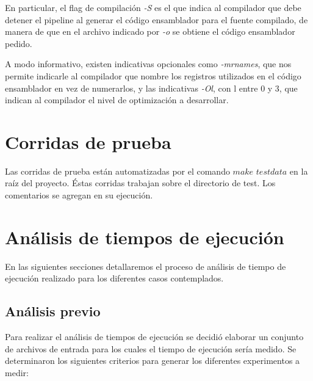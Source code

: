 \documentclass[a4paper,11pt]{article}
\begin{document}
En particular, el flag de compilación \textit{-S} es el que indica al
compilador que debe detener el pipeline al generar el código ensamblador para
el fuente compilado, de manera de que en el archivo indicado por \textit{-o} se
obtiene el código ensamblador pedido.

A modo informativo, existen indicativas opcionales como \textit{-mrnames}, que
nos permite indicarle al compilador que nombre los registros utilizados en el
código ensamblador en vez de numerarlos, y las indicativas \textit{-Ol}, con l
entre 0 y 3, que indican al compilador el nivel de optimización a desarrollar.

\section{Corridas de prueba}

Las corridas de prueba están automatizadas por el comando \(make\) \(testdata\) 
en la raíz del proyecto. Éstas corridas trabajan sobre el directorio de test.
Los comentarios se agregan en su ejecución.


\section{Análisis de tiempos de ejecución}

En las siguientes secciones detallaremos el proceso de análisis de tiempo de
ejecución realizado para los diferentes casos contemplados.

\subsection{Análisis previo}\label{sec:tiempos}

Para realizar el análisis de tiempos de ejecución se decidió elaborar un
conjunto de archivos de entrada para los cuales el tiempo de ejecución sería
medido. Se determinaron los siguientes criterios para generar los diferentes
experimentos a medir:
\end{document}
